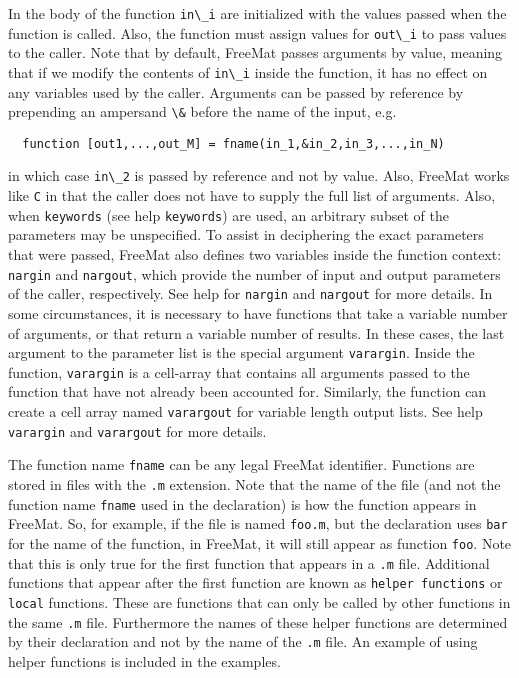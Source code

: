 In the body of the function \verb|in\_i| are initialized with the
values passed when the function is called.  Also, the function
must assign values for \verb|out\_i| to pass values to the caller.
Note that by default, FreeMat passes arguments by value, meaning
that if we modify the contents of \verb|in\_i| inside the function,
it has no effect on any variables used by the caller.  Arguments
can be passed by reference by prepending an ampersand \verb|\&|
before the name of the input, e.g.
\begin{verbatim}
  function [out1,...,out_M] = fname(in_1,&in_2,in_3,...,in_N)
\end{verbatim}
in which case \verb|in\_2| is passed by reference and not by value.
Also, FreeMat works like \verb|C| in that the caller does not have
to supply the full list of arguments.  Also, when \verb|keywords|
(see help \verb|keywords|) are used, an arbitrary subset of the 
parameters may be unspecified. To assist in deciphering 
the exact parameters that were passed,
FreeMat also defines two variables inside the function context:
\verb|nargin| and \verb|nargout|, which provide the number of input
and output parameters of the caller, respectively. See help for 
\verb|nargin| and \verb|nargout| for more details.  In some 
circumstances, it is necessary to have functions that
take a variable number of arguments, or that return a variable
number of results.  In these cases, the last argument to the 
parameter list is the special argument \verb|varargin|.  Inside
the function, \verb|varargin| is a cell-array that contains
all arguments passed to the function that have not already
been accounted for.  Similarly, the function can create a
cell array named \verb|varargout| for variable length output lists.
See help \verb|varargin| and \verb|varargout| for more details.

The function name \verb|fname| can be any legal FreeMat identifier.
Functions are stored in files with the \verb|.m| extension.  Note
that the name of the file (and not the function name \verb|fname| 
used in the declaration) is how the function appears in FreeMat.
So, for example, if the file is named \verb|foo.m|, but the declaration
uses \verb|bar| for the name of the function, in FreeMat, it will 
still appear as function \verb|foo|.  Note that this is only true
for the first function that appears in a \verb|.m| file.  Additional
functions that appear after the first function are known as
\verb|helper functions| or \verb|local| functions.  These are functions that
can only be called by other functions in the same \verb|.m| file.  Furthermore
the names of these helper functions are determined by their declaration
and not by the name of the \verb|.m| file.  An example of using
helper functions is included in the examples.


